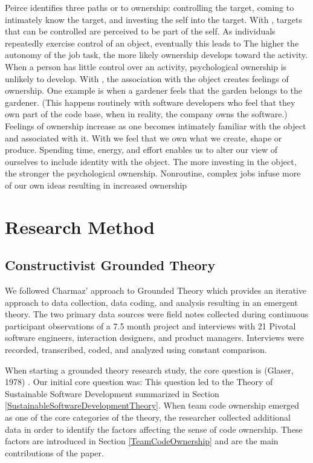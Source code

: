 Peirce identifies three paths or  to ownership: controlling the target, coming to intimately know the target, and investing the self into the target. With , targets that can be controlled are perceived to be part of the self.  As  individuals repeatedly exercise control of an object, eventually this leads to  The higher the autonomy of the job task, the more likely ownership develops toward the activity. When a person has little control over an activity, psychological ownership is unlikely to develop. With , the association with the object creates feelings of ownership. One example is when a gardener feels that the garden belongs to the gardener. (This happens routinely with software developers who feel that they own part of the code base, when in reality, the company owns the software.) Feelings of ownership increase as one becomes intimately familiar with the object and associated with it. With  we feel that we own what we create, shape or produce. Spending time, energy, and effort enables us to alter our view of ourselves to include identity with the object. The more investing in the object, the stronger the psychological ownership. Nonroutine, complex jobs infuse more of our own ideas resulting in increased ownership
\section{Research Method}
\label{ResearchMethod}
\subsection{Constructivist Grounded Theory}

We followed Charmaz' approach to Grounded Theory \cite{Charmaz} which provides an iterative approach to data collection, data coding, and analysis resulting in an emergent theory. The two primary data sources were field notes collected during continuous participant observations of a 7.5 month project and interviews with 21 Pivotal software engineers, interaction designers, and product managers. Interviews were recorded, transcribed, coded, and analyzed using constant comparison. 


When starting a grounded theory research study, the core question is  (Glaser, 1978) \cite{GlaserTheoreticalSensitivity}. Our initial core question was:  This question led to the Theory of Sustainable Software Development summarized in Section \ref{SustainableSoftwareDevelopmentTheory}. When team code ownership emerged as one of the core categories of the theory, the researcher collected additional data in order to identify the factors affecting the sense of code ownership. These factors are introduced in Section \ref{TeamCodeOwnership} and are the main contributions of the paper.
